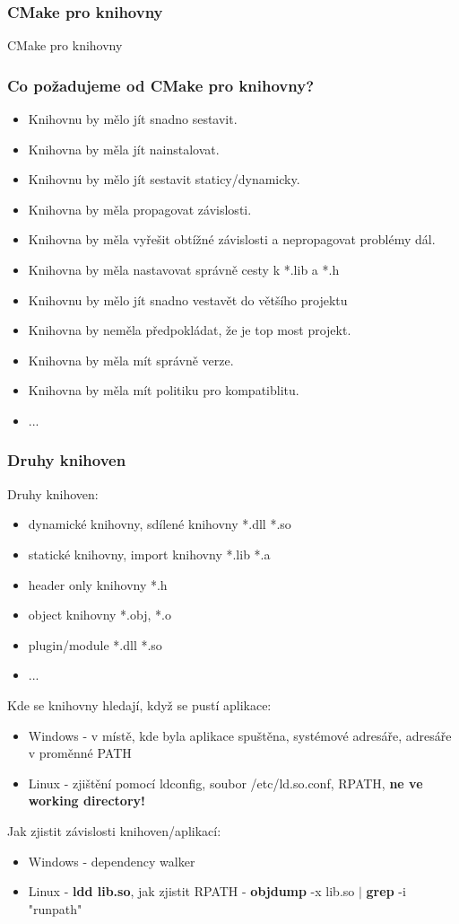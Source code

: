 \begin{frame}
\frametitle{CMake pro knihovny}
\begin{center}
\Huge {\color{white}CMake pro knihovny}
\end{center}
\end{frame}

\begin{frame}[fragile]
\frametitle{Co požadujeme od CMake pro knihovny?}
	\begin{itemize}
  \item Knihovnu by mělo jít snadno sestavit.
	\item Knihovna by měla jít nainstalovat.
  \item Knihovnu by mělo jít sestavit staticy/dynamicky.
  \item Knihovna by měla propagovat závislosti.
  \item Knihovna by měla vyřešit obtížné závislosti a nepropagovat problémy dál.
  \item Knihovna by měla nastavovat správně cesty k *.lib a *.h
  \item Knihovnu by mělo jít snadno vestavět do většího projektu
  \item Knihovna by neměla předpokládat, že je top most projekt.
  \item Knihovna by měla mít správně verze.
  \item Knihovna by měla mít politiku pro kompatiblitu.
  \item ...
	\end{itemize}
\end{frame}


\begin{frame}[fragile]
\frametitle{Druhy knihoven}
Druhy knihoven:
	\begin{itemize}
	\item dynamické knihovny, sdílené knihovny *.dll *.so
  \item statické knihovny, import knihovny *.lib *.a
  \item header only knihovny *.h
  \item object knihovny *.obj, *.o
  \item plugin/module *.dll *.so
  \item ...
	\end{itemize}
Kde se knihovny hledají, když se pustí aplikace:
	\begin{itemize}
	\item Windows - v místě, kde byla aplikace spuštěna, systémové adresáře, adresáře v proměnné PATH
  \item Linux - zjištění pomocí ldconfig, soubor /etc/ld.so.conf, RPATH, \textbf{ne ve working directory!}
	\end{itemize}
Jak zjistit závislosti knihoven/aplikací:
	\begin{itemize}
	\item Windows - dependency walker
  \item Linux - \textbf{ldd lib.so}, jak zjistit RPATH - \textbf{objdump} -x lib.so $|$ \textbf{grep} -i "runpath"
	\end{itemize}
\end{frame}

